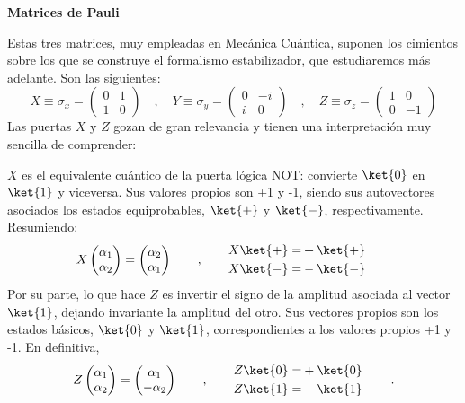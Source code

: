 \documentclass[11pt,a4paper,twoside,pdf]{article}
\numberwithin{equation}{section}
\begin{document}
		\begin{flushleft}{\textbf{Matrices de Pauli }}\end{flushleft}
			Estas tres matrices, muy empleadas en Mecánica Cuántica, suponen los cimientos sobre los que se construye el formalismo estabilizador, que estudiaremos más adelante. Son las siguientes:
				\begin{equation} \label{eq: Pauli}
					X \equiv \sigma_x = \left(\begin{array}{cc}0 & 1\\1 & 0\end{array}\right)		\quad , \quad
					Y \equiv \sigma_y = \left(\begin{array}{cc}0 & -i\\i & 0\end{array}\right)		 \quad , \quad
					Z \equiv \sigma_z = \left(\begin{array}{cc}1 & 0\\0 & -1\end{array}\right)		
				\end{equation}		 
			Las puertas $X$ y $Z$ gozan de gran relevancia y  tienen una interpretación muy sencilla de comprender:
		
			$X$ es el equivalente cuántico de la puerta lógica NOT: convierte $\ket{0} $ en $\ket{1}$ y viceversa. Sus valores propios son +1 y -1, siendo sus autovectores asociados los estados equiprobables, $\ket{+} $ y $\ket{-} $, respectivamente. Resumiendo:
				\begin{equation} \label{eq: Pauli X}
					X \left( \begin{matrix} \alpha_1 \\ \alpha_2 \end{matrix} \right) =  \left( \begin{matrix} \alpha_2 \\ \alpha_1 \end{matrix} \right)			\qquad , \qquad
					\begin{aligned}X\ket{+} =&+\ket{+}  \\X\ket{-} =&-\ket{-} \end{aligned}	\qquad 	
				\end{equation}	
			Por su parte, lo que hace $Z$ es invertir el signo de la amplitud asociada al vector $\ket{1} $, dejando invariante la amplitud del otro. Sus vectores propios son los estados básicos, $\ket{0}$ y $\ket{1}$, correspondientes a los valores propios +1 y -1. En definitiva,
			\begin{equation} \label{eq: Pauli Z}
				Z  \left( \begin{matrix} \alpha_1 \\ \alpha_2 \end{matrix} \right) =  \left( \begin{matrix} \alpha_1 \\ - \alpha_2 \end{matrix} \right)			\qquad , \qquad
				\begin{aligned}Z\ket{0} =&+\ket{0}  \\Z\ket{1} =&-\ket{1} \end{aligned}		\;\qquad.			
			\end{equation}	
			
\end{document}
